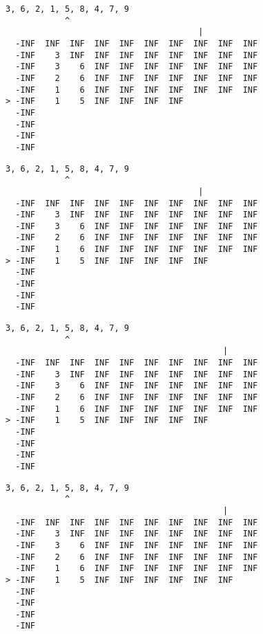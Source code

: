 { \begin{verbatim}
3, 6, 2, 1, 5, 8, 4, 7, 9
            ^
                                       |
  -INF  INF  INF  INF  INF  INF  INF  INF  INF  INF
  -INF    3  INF  INF  INF  INF  INF  INF  INF  INF
  -INF    3    6  INF  INF  INF  INF  INF  INF  INF
  -INF    2    6  INF  INF  INF  INF  INF  INF  INF
  -INF    1    6  INF  INF  INF  INF  INF  INF  INF
> -INF    1    5  INF  INF  INF  INF               
  -INF                                             
  -INF                                             
  -INF                                             
  -INF                                             
\end{verbatim} }

{ \begin{verbatim}
3, 6, 2, 1, 5, 8, 4, 7, 9
            ^
                                       |
  -INF  INF  INF  INF  INF  INF  INF  INF  INF  INF
  -INF    3  INF  INF  INF  INF  INF  INF  INF  INF
  -INF    3    6  INF  INF  INF  INF  INF  INF  INF
  -INF    2    6  INF  INF  INF  INF  INF  INF  INF
  -INF    1    6  INF  INF  INF  INF  INF  INF  INF
> -INF    1    5  INF  INF  INF  INF  INF          
  -INF                                             
  -INF                                             
  -INF                                             
  -INF                                             
\end{verbatim} }

{ \begin{verbatim}
3, 6, 2, 1, 5, 8, 4, 7, 9
            ^
                                            |
  -INF  INF  INF  INF  INF  INF  INF  INF  INF  INF
  -INF    3  INF  INF  INF  INF  INF  INF  INF  INF
  -INF    3    6  INF  INF  INF  INF  INF  INF  INF
  -INF    2    6  INF  INF  INF  INF  INF  INF  INF
  -INF    1    6  INF  INF  INF  INF  INF  INF  INF
> -INF    1    5  INF  INF  INF  INF  INF          
  -INF                                             
  -INF                                             
  -INF                                             
  -INF                                             
\end{verbatim} }

{ \begin{verbatim}
3, 6, 2, 1, 5, 8, 4, 7, 9
            ^
                                            |
  -INF  INF  INF  INF  INF  INF  INF  INF  INF  INF
  -INF    3  INF  INF  INF  INF  INF  INF  INF  INF
  -INF    3    6  INF  INF  INF  INF  INF  INF  INF
  -INF    2    6  INF  INF  INF  INF  INF  INF  INF
  -INF    1    6  INF  INF  INF  INF  INF  INF  INF
> -INF    1    5  INF  INF  INF  INF  INF  INF     
  -INF                                             
  -INF                                             
  -INF                                             
  -INF                                             
\end{verbatim} }

